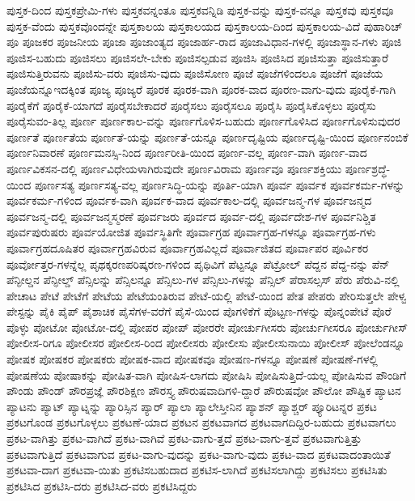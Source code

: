 {ಪುಸ್ತಕ-ದಿಂದ
ಪುಸ್ತಕಪ್ರೇಮಿ-ಗಳು
ಪುಸ್ತಕವನ್ನಂತೂ
ಪುಸ್ತಕವನ್ನಿಡಿ
ಪುಸ್ತಕ-ವನ್ನು
ಪುಸ್ತಕ-ವನ್ನೂ
ಪುಸ್ತಕವು
ಪುಸ್ತಕವೂ
ಪುಸ್ತಕ-ವೆಂದು
ಪುಸ್ತಕವೊಂದನ್ನೇ
ಪುಸ್ತಕಾಲಯ
ಪುಸ್ತಕಾಲಯದ
ಪುಸ್ತಕಾಲಯ-ದಿಂದ
ಪುಸ್ತಕಾಲಯ-ವಿದೆ
ಪುಹಾರಿಚ್
ಪೂ
ಪೂಜಕರ
ಪೂಜನೀಯ
ಪೂಜಾ
ಪೂಜಾಂತ್ಯದ
ಪೂಜಾರ್ಹ-ರಾದ
ಪೂಜಾವಿಧಾನ-ಗಳಲ್ಲಿ
ಪೂಜಾಸ್ಥಾನ-ಗಳು
ಪೂಜಿ
ಪೂಜಿಸ-ಬಹುದು
ಪೂಜಿಸಲು
ಪೂಜಿಸಲೇ-ಬೇಕು
ಪೂಜಿಸಲ್ಪಡುವ
ಪೂಜಿಸಿ
ಪೂಜಿಸಿದ
ಪೂಜಿಸುತ್ತಾ
ಪೂಜಿಸುತ್ತಾರೆ
ಪೂಜಿಸುತ್ತಿರುವನು
ಪೂಜಿಸು-ವರು
ಪೂಜಿಸು-ವುದು
ಪೂಜಿಸೋಣ
ಪೂಜೆ
ಪೂಜೆಗಳಿಂದಲೂ
ಪೂಜೆಗೆ
ಪೂಜೆಯ
ಪೂಜೆಯನ್ನೂಇದಕ್ಕಿಂತ
ಪೂಜ್ಯ
ಪೂಜ್ಯರೆ
ಪೂರಕ
ಪೂರಕ-ವಾಗಿ
ಪೂರಕ-ವಾದ
ಪೂರಣ-ವಾಗು-ವುದು
ಪೂರೈಕೆ-ಗಾಗಿ
ಪೂರೈಕೆಗೆ
ಪೂರೈಕೆ-ಯಾಗದೆ
ಪೂರೈಸಬೇಕಾದರೆ
ಪೂರೈಸಲು
ಪೂರೈಸಲೂ
ಪೂರೈಸಿ
ಪೂರೈಸಿಕೊಳ್ಳಲು
ಪೂರೈಸು
ಪೂರೈಸುವಂ-ತಿಲ್ಲ
ಪೂರ್ಣ
ಪೂರ್ಣಕಾಲ-ವನ್ನು
ಪೂರ್ಣಗೊಳಿಸ-ಬಹುದು
ಪೂರ್ಣಗೊಳಿಸಿದ
ಪೂರ್ಣಗೊಳಿಸುವುದರ
ಪೂರ್ಣತೆ
ಪೂರ್ಣತೆಯ
ಪೂರ್ಣತೆ-ಯನ್ನು
ಪೂರ್ಣತೆ-ಯನ್ನೂ
ಪೂರ್ಣದೃಷ್ಟಿಯ
ಪೂರ್ಣದೃಷ್ಟಿ-ಯಿಂದ
ಪೂರ್ಣನಂಬಿಕೆ
ಪೂರ್ಣನಿವಾರಣೆ
ಪೂರ್ಣಮನಸ್ಸಿ-ನಿಂದ
ಪೂರ್ಣರೀತಿ-ಯಿಂದ
ಪೂರ್ಣ-ವಲ್ಲ
ಪೂರ್ಣ-ವಾಗಿ
ಪೂರ್ಣ-ವಾದ
ಪೂರ್ಣವಿಕಸನ-ದಲ್ಲಿ
ಪೂರ್ಣವಿಧೇಯಳಾಗಿರುವುದೇ
ಪೂರ್ಣವಿರಾಮ
ಪೂರ್ಣವೂ
ಪೂರ್ಣಶಕ್ತಿಯು
ಪೂರ್ಣಶ್ರದ್ಧೆ-ಯಿಂದ
ಪೂರ್ಣಸತ್ಯ
ಪೂರ್ಣಸತ್ಯ-ವಲ್ಲ
ಪೂರ್ಣಸಿದ್ಧಿ-ಯನ್ನು
ಪೂರ್ತಿ-ಯಾಗಿ
ಪೂರ್ವ
ಪೂರ್ವಕ
ಪೂರ್ವಕರ್ಮ-ಗಳನ್ನು
ಪೂರ್ವಕರ್ಮ-ಗಳಿಂದ
ಪೂರ್ವಕ-ವಾಗಿ
ಪೂರ್ವಕ-ವಾದ
ಪೂರ್ವಕಾಲ-ದಲ್ಲಿ
ಪೂರ್ವಜನ್ಮ-ಗಳ
ಪೂರ್ವಜನ್ಮದ
ಪೂರ್ವಜನ್ಮ-ದಲ್ಲಿ
ಪೂರ್ವಜನ್ಮಸ್ಮರಣೆ
ಪೂರ್ವಜರು
ಪೂರ್ವದ
ಪೂರ್ವ-ದಲ್ಲಿ
ಪೂರ್ವದೇಶ-ಗಳ
ಪೂರ್ವನಿಶ್ಚಿತ
ಪೂರ್ವಪುರುಷರು
ಪೂರ್ವಯೋಜಿತ
ಪೂರ್ವಸ್ಥಿತಿಗೇ
ಪೂರ್ವಾಗ್ರಹ
ಪೂರ್ವಾಗ್ರಹ-ಗಳನ್ನೂ
ಪೂರ್ವಾಗ್ರಹ-ಗಳು
ಪೂರ್ವಾಗ್ರಹದೂಷಿತರ
ಪೂರ್ವಾಗ್ರಹವಿರುವ
ಪೂರ್ವಾಗ್ರಹವಿಲ್ಲದೆ
ಪೂರ್ವಾಜಿತದ
ಪೂರ್ವಾಪರ
ಪೂರ್ವಿಕರ
ಪೂರ್ವೋತ್ತರ-ಗಳನ್ನೆಲ್ಲ
ಪೃಥಕ್ಕರಣಪರಿಷ್ಕರಣ-ಗಳಿಂದ
ಪೃಥಿವಿಗೆ
ಪೆಟ್ಟನ್ನೂ
ಪೆಟ್ರೋಲ್
ಪೆದ್ದನ
ಪೆದ್ದ-ನನ್ನು
ಪೆನ್
ಪೆನ್ಫೀಲ್ಡನ
ಪೆನ್ಫೀಲ್ಡ್
ಪೆನ್ಸಿಲನ್ನು
ಪೆನ್ಸಿಲನ್ನೂ
ಪೆನ್ಸಿಲು-ಗಳ
ಪೆನ್ಸಿಲು-ಗಳನ್ನು
ಪೆನ್ಸಿಲ್
ಪೆರಾಸಲ್ಸಸ್
ಪೆರು
ಪೆರುವಿ-ನಲ್ಲಿ
ಪೇಚಾಟ
ಪೇಟೆ
ಪೇಟೆಗೆ
ಪೇಟೆಯ
ಪೇಟೆಯಂತಿರುವ
ಪೇಟೆ-ಯಲ್ಲಿ
ಪೇಟೆ-ಯಿಂದ
ಪೇತ
ಪೇಪರು
ಪೇರಿಸುತ್ತಲೇ
ಪೇಳ್ವ
ಪೇಸ್ಟನ್ನು
ಪೈಕಿ
ಪೈಪ್
ಪೈಶಾಚಿಕ
ಪೈಸೆಗಳ-ವರೆಗೆ
ಪೈಸೆ-ಯಿಂದ
ಪೊಗಳಿಕೆಗೆ
ಪೊಟ್ಟಣ-ಗಳನ್ನು
ಪೊನ್ನಂಪೇಟೆ
ಪೊರೆ
ಪೊಳ್ಳು
ಪೋಟೋ
ಪೋಟೋ-ದಲ್ಲಿ
ಪೋಪರ
ಪೋಪ್
ಪೋರರೇ
ಪೋರ್ಚುಗೀಸರು
ಪೋರ್ಚುಗೀಸರೂ
ಪೋರ್ಚುಗೀಸ್
ಪೋಲೀಸ-ರಿಗೂ
ಪೋಲೀಸರ
ಪೋಲೀಸ-ರಿಂದ
ಪೋಲೀಸರು
ಪೋಲೀಸು
ಪೋಲೀಸುನಾಯಿ
ಪೋಲೀಸ್
ಪೋಲೆಂಡನ್ನೂ
ಪೋಷಕ
ಪೋಷಕರ
ಪೋಷಕರು
ಪೋಷಕ-ವಾದ
ಪೋಷಕವೂ
ಪೋಷಣ-ಗಳನ್ನೂ
ಪೋಷಣೆ
ಪೋಷಣೆ-ಗಳಲ್ಲಿ
ಪೋಷಣೆಯ
ಪೋಷಾಕನ್ನು
ಪೋಷಿತ-ವಾಗಿ
ಪೋಷಿಸ-ಲಾಗದು
ಪೋಷಿಸಿ
ಪೋಷಿಸುತ್ತಿದೆ-ಯಲ್ಲ
ಪೋಷಿಸುವ
ಪೌಂಡಿಗೆ
ಪೌಂಡು
ಪೌಂಡ್
ಪೌರಪ್ರಜ್ಞೆ
ಪೌರಶಿಕ್ಷಣ
ಪೌರಸ್ತ್ಯ
ಪೌರುಷವಾದಿಗಳಿ-ದ್ದಾರೆ
ಪೌರುಷವೋ
ಪೌಲೋ
ಪೌಷ್ಟಿಕ
ಪ್ಯಾಟನ
ಪ್ಯಾಟನು
ಪ್ಯಾಟ್
ಪ್ಯಾಟ್ನನ್ನು
ಪ್ಯಾರಿಸ್ಸಿನ
ಪ್ಯಾರ್
ಪ್ಯಾಲಾ
ಪ್ಯಾಲೇಸ್ತೀನಿನ
ಪ್ಯಾಶನ್
ಪ್ಯಾಶ್ಚರ್
ಪ್ಯೂರಿಟನ್ನರ
ಪ್ರಕಟ
ಪ್ರಕಟಗೊಂಡ
ಪ್ರಕಟಗೊಳ್ಳಲು
ಪ್ರಕಟಣೆ-ಯಾದ
ಪ್ರಕಟನ
ಪ್ರಕಟವಾಗದ
ಪ್ರಕಟವಾಗದಿದ್ದಿರ-ಬಹುದು
ಪ್ರಕಟವಾಗಲು
ಪ್ರಕಟ-ವಾಗಿತ್ತು
ಪ್ರಕಟ-ವಾಗಿದೆ
ಪ್ರಕಟ-ವಾಗಿವೆ
ಪ್ರಕಟ-ವಾಗು-ತ್ತದೆ
ಪ್ರಕಟ-ವಾಗು-ತ್ತವೆ
ಪ್ರಕಟವಾಗುತ್ತಿತ್ತು
ಪ್ರಕಟವಾಗುತ್ತಿದೆ
ಪ್ರಕಟವಾಗುವ
ಪ್ರಕಟ-ವಾಗು-ವುದನ್ನು
ಪ್ರಕಟ-ವಾಗು-ವುದು
ಪ್ರಕಟ-ವಾದ
ಪ್ರಕಟವಾದಂತಾಯಿತೆ
ಪ್ರಕಟವಾ-ದಾಗ
ಪ್ರಕಟವಾ-ಯಿತು
ಪ್ರಕಟಿಸಬಹುದಾದ
ಪ್ರಕಟಿಸ-ಲಾಗಿದೆ
ಪ್ರಕಟಿಸಲಾಗಿದ್ದು
ಪ್ರಕಟಿಸಲು
ಪ್ರಕಟಿಸಿತು
ಪ್ರಕಟಿಸಿದ
ಪ್ರಕಟಿಸಿ-ದರು
ಪ್ರಕಟಿಸಿದ-ವರು
ಪ್ರಕಟಿಸಿದ್ದರು
}
